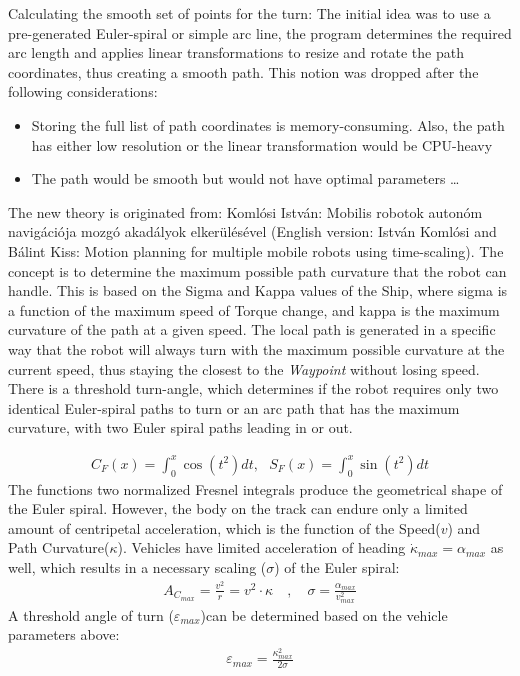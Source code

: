 Calculating the smooth set of points for the turn:
The initial idea was to use a pre-generated Euler-spiral or simple arc line, the program determines the required arc length and applies linear transformations to resize and rotate the path coordinates, thus creating a smooth path.
This notion was dropped after the following considerations:
\begin{itemize}
\item Storing the full list of path coordinates is memory-consuming. Also, the path has either low resolution or the linear transformation would be CPU-heavy
\item The path would be smooth but would not have optimal parameters \ldots
\end{itemize}

The new theory is originated from: Koml\'osi Istv\'an: Mobilis robotok auton\'om navig\'aci\'oja mozg\'o akad\'alyok elker\"ul\'es\'evel (English version: Istv\'an Koml\'osi and B\'alint Kiss: Motion planning for multiple mobile robots using time-scaling).
The concept is to determine the maximum possible path curvature that the robot can handle. This is based on the Sigma and Kappa values of the Ship, where sigma is a function of the maximum speed of Torque change, and kappa is the maximum curvature of the path at a given speed. The local path is generated in a specific way that the robot will always turn with the maximum possible curvature at the current speed, thus staying the closest to the \emph{Waypoint} without losing speed. There is a threshold turn-angle, which determines if the robot requires only two identical Euler-spiral paths to turn or an arc path that has the maximum curvature, with two Euler spiral paths leading in or out.

\begin{align}
C_F(x) = \int_0^x \cos(t^2)dt,\,\,\,\,S_F(x) = \int_0^x \sin(t^2)dt
\label{eq:fresnel}
\end{align}
The functions two normalized Fresnel integrals produce the geometrical shape of the Euler spiral. However, the body on the track can endure only a limited amount of centripetal acceleration, which is the function of the Speed($v$) and Path Curvature($\kappa$). Vehicles have limited acceleration of heading $\dot{\kappa}_{max} = \alpha_{max}$ as well, which results in a necessary scaling ($\sigma$) of the Euler spiral:
\begin{align}
A_{C_{max}} = \frac{v^2}{r} = v^2 \cdot \kappa \quad , \quad \sigma = \frac{\alpha_{max}}{v^2_{max}}
\end{align}
A threshold angle of turn ($\varepsilon_{max}$)can be determined based on the vehicle parameters above:
\begin{align}
\varepsilon_{max} = \frac{\kappa^2_{max}}{2\sigma}
\end{align}

